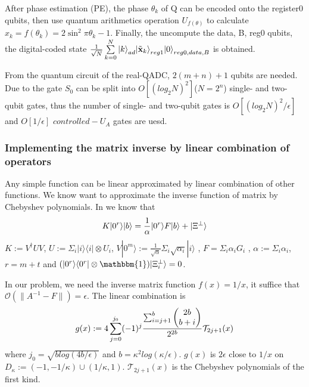 \documentclass[%
 reprint,
 amsmath,amssymb,
pra,
]{revtex4-1}
\begin{document}
After phase estimation (PE), the phase ${\theta _k}$ of Q can be encoded onto the register0 qubits, then use quantum arithmetics operation ${U_{f\left( \theta  \right)}}$ to calculate
${x_k} = f\left( {{\theta _k}} \right) = 2{\sin ^2}\pi {\theta _k} - 1$.
Finally, the uncompute the data, B, reg0 qubits, the digital-coded state
$\frac{1}{{\sqrt N }}\sum\limits_{k = 0}^N {{{\left| k \right\rangle }_{ad}}{{\left| {{{\tilde {\textbf x}}_k}} \right\rangle }_{reg1}}{{\left| 0 \right\rangle }_{reg0,data,B}}} $
is obtained.


From the quantum circuit of the real-QADC, $2(m+n)+1$ qubits are needed. Due to the gate $S_0$ can be split into $O[(log_{2}N)^2]$($N=2^n$) 
single- and two-qubit gates\cite{barenco_elementary_1995}, thus the number of single- and two-qubit gates is $O[(log_{2}N)^2/{\epsilon}]$ and $O[1/{\epsilon}]$ $controlled-U_A$ gates are uesd\cite{mitarai2019quantum}.


\subsubsection{Implementing the matrix inverse by linear combination of operators}
Any simple function can be linear approximated by linear combination of other
functions. We know want to approximate the inverse function of matrix by
Chebyshev polynomials. In \cite{Childs2017Quantum} we know that 
\begin{equation}
\label{K}
K|0^r\rangle|b\rangle=\frac{1}{\alpha}|0^r\rangle F|b\rangle
+|\Xi^\bot \rangle\notag
\end{equation}
$K:=V^\dagger UV$, $U:=\Sigma_i|i\rangle\langle i|
\otimes U_i$, 
$V|0^m\rangle:=\frac{1}{\sqrt{\alpha}}\Sigma_i\sqrt{\alpha_i}|i\rangle$
, $F=\Sigma_i\alpha_iG_i$
, $\alpha:=\Sigma_i\alpha_i$, $r=m+t$ and 
$(|0^r\rangle\langle0^r|\otimes\mathbbm{1})|\Xi_i^\bot\rangle=0$.

In our problem, we need the inverse matrix function $f(x) = 1/x$, 
it suffice that $\mathcal{O}(\lVert A^{-1}-F\rVert)=\epsilon$.
The linear combination\cite{Childs2017Quantum} is
\begin{equation}
g(x):=4\sum_{j=0}^{j_0}(-1)^j
\frac{\sum_{i=j+1}^{b}\begin{pmatrix}
2b\\b+i
\end{pmatrix}}{2^{2b}}\mathcal{T}_{2j+1}(x)\notag
\end{equation}
where $j_0=\sqrt{b log(4b/\epsilon)}$ and $b=\kappa^2log(\kappa/\epsilon)$.
$g(x)$ is $2\epsilon$ close to $1/x$ on $D_\kappa:=(-1,-1/\kappa)\cup
(1/\kappa,1)$.
$\mathcal{T}_{2j+1}(x)$ is the Chebyshev polynomials of the first kind.
\end{document}
